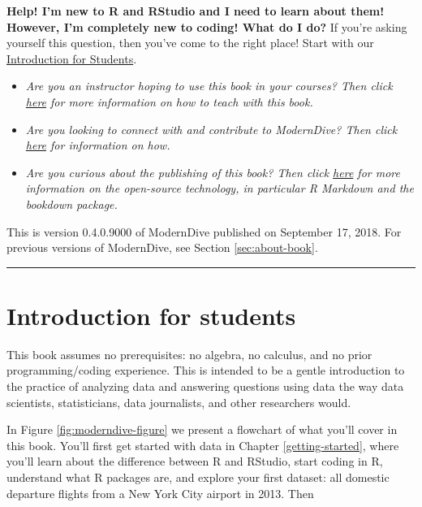 \documentclass[12pt,]{krantz}
\providecommand{\tightlist}{%
  \setlength{\itemsep}{0pt}\setlength{\parskip}{0pt}}
\theoremstyle{definition}
\theoremstyle{definition}
\theoremstyle{definition}
\theoremstyle{remark}
\begin{document}
\textbf{Help! I'm new to R and RStudio and I need to learn about them!
However, I'm completely new to coding! What do I do?} If you're asking
yourself this question, then you've come to the right place! Start with
our \protect\hyperlink{sec:intro-for-students}{Introduction for
Students}.

\begin{itemize}
\tightlist
\item
  \emph{Are you an instructor hoping to use this book in your courses?
  Then click \protect\hyperlink{sec:intro-instructors}{here} for more
  information on how to teach with this book.}
\item
  \emph{Are you looking to connect with and contribute to ModernDive?
  Then click \protect\hyperlink{sec:connect-contribute}{here} for
  information on how.}
\item
  \emph{Are you curious about the publishing of this book? Then click
  \protect\hyperlink{sec:about-book}{here} for more information on the
  open-source technology, in particular R Markdown and the bookdown
  package.}
\end{itemize}

This is version 0.4.0.9000 of ModernDive published on September 17,
2018. For previous versions of ModernDive, see Section
\ref{sec:about-book}.

\begin{center}\rule{0.5\linewidth}{\linethickness}\end{center}

\hypertarget{sec:intro-for-students}{\section{Introduction for
students}\label{sec:intro-for-students}}

This book assumes no prerequisites: no algebra, no calculus, and no
prior programming/coding experience. This is intended to be a gentle
introduction to the practice of analyzing data and answering questions
using data the way data scientists, statisticians, data journalists, and
other researchers would.

In Figure \ref{fig:moderndive-figure} we present a flowchart of what
you'll cover in this book. You'll first get started with data in Chapter
\ref{getting-started}, where you'll learn about the difference between R
and RStudio, start coding in R, understand what R packages are, and
explore your first dataset: all domestic departure flights from a New
York City airport in 2013. Then
\end{document}
